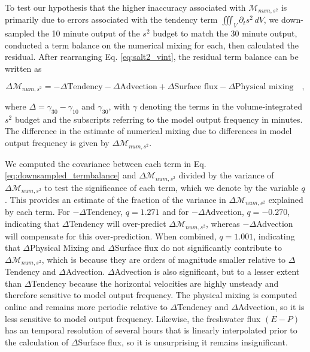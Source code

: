 \documentclass[draft]{agujournal2019}
\begin{document}
To test our hypothesis that the higher inaccuracy associated with $\mathcal{M}_{num, s^2}$ is primarily due to errors associated with the tendency term $\iiint_V \partial_t s^2 \, dV$, we down-sampled the 10 minute output of the $s^2$ budget to match the 30 minute output, conducted a term balance on the numerical mixing for each, then calculated the residual. After rearranging Eq. \ref{eq:salt2_vint}, the residual term balance can be written as 
\begin{linenomath*}
\begin{equation} \label{eq:downsampled_termbalance}
    \Delta \mathcal{M}_{num, s^2} = -\Delta \textrm{Tendency}-\Delta \textrm{Advection}+\Delta \textrm{Surface flux}-\Delta \textrm{Physical mixing} \quad ,
\end{equation}
\end{linenomath*}
where $\Delta = \gamma_{30}-\gamma_{10}$ and $\gamma_{30}$, with $\gamma$ denoting the terms in the volume-integrated $s^2$ budget and the subscripts referring to the model output frequency in minutes. The difference in the estimate of numerical mixing due to differences in model output frequency is given by $\Delta \mathcal{M}_{num, s^2}$. 

We computed the covariance between each term in Eq. \ref{eq:downsampled_termbalance} and $\Delta \mathcal{M}_{num, s^2}$ divided by the variance of $\Delta \mathcal{M}_{num, s^2}$ to test the significance of each term, which we denote by the variable $q$. This provides an estimate of the fraction of the variance in $\Delta \mathcal{M}_{num, s^2}$ explained by each term. For $-\Delta$Tendency, $q = 1.271$ and for $-\Delta$Advection, $q = -0.270$, indicating that $\Delta$Tendency will over-predict $\Delta \mathcal{M}_{num, s^2}$, whereas $-\Delta$Advection will compensate for this over-prediction. When combined, $q = 1.001$, indicating that $\Delta$Physical Mixing and $\Delta$Surface flux do not significantly contribute to $\Delta \mathcal{M}_{num, s^2}$, which is because they are orders of magnitude smaller relative to $\Delta$Tendency and $\Delta$Advection. $\Delta$Advection is also significant, but to a lesser extent than $\Delta$Tendency because the horizontal velocities are highly unsteady and therefore sensitive to model output frequency. The physical mixing is computed online and remains more periodic relative to $\Delta$Tendency and $\Delta$Advection, so it is less sensitive to model output frequency. Likewise, the freshwater flux $(E-P)$ has an temporal resolution of several hours that is linearly interpolated prior to the calculation of $\Delta$Surface flux, so it is unsurprising it remains insignificant.
\end{document}
